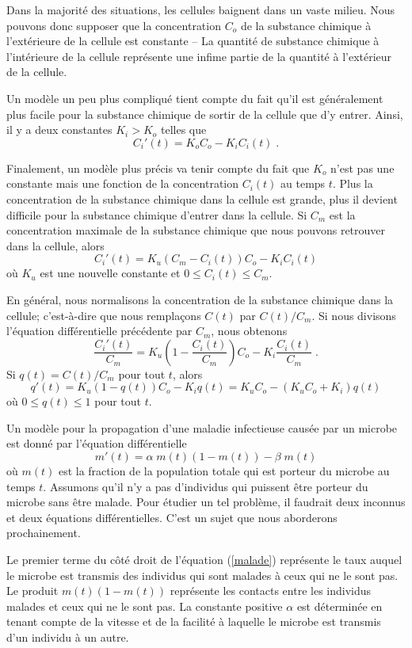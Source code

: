 {\begin{egg}[\life]
Dans la majorité des situations, les cellules baignent dans un vaste
milieu. Nous pouvons donc supposer que la concentration $C_o$ de la
substance chimique à l'extérieure de la cellule est constante -- La
quantité de substance chimique à l'intérieure de la cellule représente
une infime partie de la quantité à l'extérieur de la cellule.

Un modèle un peu plus compliqué tient compte du fait qu'il est
généralement plus facile pour la substance chimique de sortir de la
cellule que d'y entrer.  Ainsi, il y a deux constantes $K_i > K_o$ telles
que
\[
C_i'(t) = K_o C_o - K_iC_i(t) \; .
\]

Finalement, un modèle plus précis va tenir compte du fait que $K_o$
n'est pas une constante mais une fonction de la concentration $C_i(t)$
au temps $t$. Plus la concentration de la substance chimique dans la
cellule est grande, plus il devient difficile pour la substance
chimique d'entrer dans la cellule.  Si $C_m$ est la concentration
maximale de la substance chimique que nous pouvons retrouver dans la
cellule, alors
\[
C_i'(t) = K_u ( C_m - C_i(t) ) C_o - K_iC_i(t)
\]
où $K_u$ est une nouvelle constante et $0\leq C_i(t) \leq C_m$.

En général, nous normalisons la concentration de la substance chimique
dans la cellule; c'est-à-dire que nous remplaçons $C(t)$ par
$C(t)/C_m$. Si nous divisons l'équation différentielle précédente par
$C_m$, nous obtenons
\[
\frac{C_i'(t)}{C_m} = K_u \left( 1 - \frac{C_i(t)}{C_m} \right)
C_o - K_i \frac{C_i(t)}{C_m} \; .
\]
Si $q(t) = C(t)/C_m$ pour tout $t$, alors
\[
q'(t) = K_u ( 1 - q(t) ) C_o - K_i q(t)
= K_u C_o - ( K_u C_o + K_i )q(t)
\]
où $0\leq q(t) \leq 1$ pour tout $t$.
\end{egg}

\begin{egg}[\life]
Un modèle pour la propagation d'une maladie infectieuse causée par un
microbe est donné par l'équation différentielle
\begin{equation} \label{malade}
m'(t)= \alpha \; m(t) (1-m(t)) - \beta \; m(t)
\end{equation}
où $m(t)$ est la fraction de la population totale qui est porteur du
microbe au temps $t$.  Assumons qu'il n'y a pas d'individus qui
puissent être porteur du microbe sans être malade.  Pour étudier un
tel problème, il faudrait deux inconnus et deux équations
différentielles.  C'est un sujet que nous aborderons prochainement.

Le premier terme du côté droit de l'équation (\ref{malade}) représente
le taux auquel le microbe est transmis des individus qui sont malades
à ceux qui ne le sont pas.  Le produit $m(t)(1-m(t))$ représente les
contacts entre les individus malades et ceux qui ne le sont pas.  La
constante positive $\alpha$ est déterminée en tenant compte de la
vitesse et de la facilité à laquelle le microbe est transmis d'un
individu à un autre.


\end{egg}}
